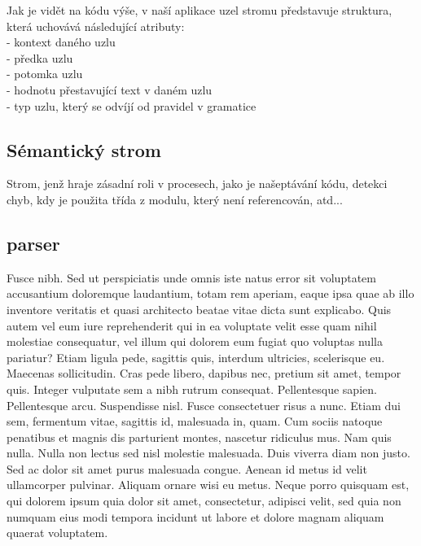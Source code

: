 \documentclass[czech,master,dept460,male,cpp,cpdeclaration]{diploma}
\begin{document}
Jak je vidět na kódu výše, v naší aplikace uzel stromu představuje struktura, která uchovává následující atributy:\\
	- kontext daného uzlu\\
	- předka uzlu\\
	- potomka uzlu\\
	- hodnotu přestavující text v daném uzlu\\
	- typ uzlu, který se odvíjí od pravidel v gramatice\\

\subsection{Sémantický strom}
Strom, jenž hraje zásadní roli v procesech, jako je našeptávání kódu, detekci chyb, kdy je použita třída z modulu, který není referencován, atd...

\subsection{parser}
Fusce nibh. Sed ut perspiciatis unde omnis iste natus error sit voluptatem accusantium doloremque laudantium, totam rem aperiam, eaque ipsa quae ab illo inventore veritatis et quasi architecto 
beatae vitae dicta sunt explicabo. Quis autem vel eum iure reprehenderit qui in ea voluptate velit esse quam nihil molestiae consequatur, vel illum qui dolorem eum fugiat quo voluptas nulla pariatur? Etiam ligula pede, sagittis quis, interdum ultricies, scelerisque eu. Maecenas sollicitudin. Cras pede libero, dapibus nec, pretium sit amet, tempor quis. Integer vulputate sem a nibh rutrum consequat. Pellentesque sapien. Pellentesque arcu. Suspendisse nisl. Fusce consectetuer risus a nunc. Etiam dui sem, fermentum vitae, sagittis id, malesuada in, quam. Cum sociis natoque penatibus et magnis dis parturient montes, nascetur ridiculus mus. Nam quis nulla. Nulla non lectus sed nisl molestie malesuada. Duis viverra diam non justo. Sed ac dolor sit amet purus malesuada congue. Aenean id metus id velit ullamcorper pulvinar. Aliquam ornare wisi eu metus. Neque porro quisquam est, qui dolorem ipsum quia dolor sit amet, consectetur, adipisci velit, sed quia non numquam eius modi tempora incidunt ut labore et dolore magnam aliquam quaerat voluptatem.
\end{document}
